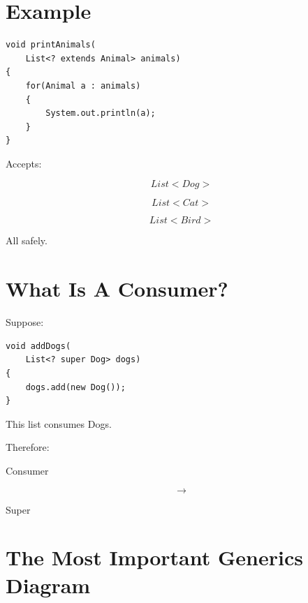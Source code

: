\documentclass[11pt,a4paper]{book}
\begin{document}

\section{Example}

\begin{verbatim} 
void printAnimals(
    List<? extends Animal> animals)
{
    for(Animal a : animals)
    {
        System.out.println(a);
    }
}
\end{verbatim}


Accepts:

\[
List<Dog>
\]


\[
List<Cat>
\]


\[
List<Bird>
\]


All safely.


\section{What Is A Consumer?}

Suppose:

\begin{verbatim} 
void addDogs(
    List<? super Dog> dogs)
{
    dogs.add(new Dog());
}
\end{verbatim}


This list consumes Dogs.


Therefore:


Consumer

\[
\rightarrow
\]

Super


\section{The Most Important Generics Diagram}
\end{document}
